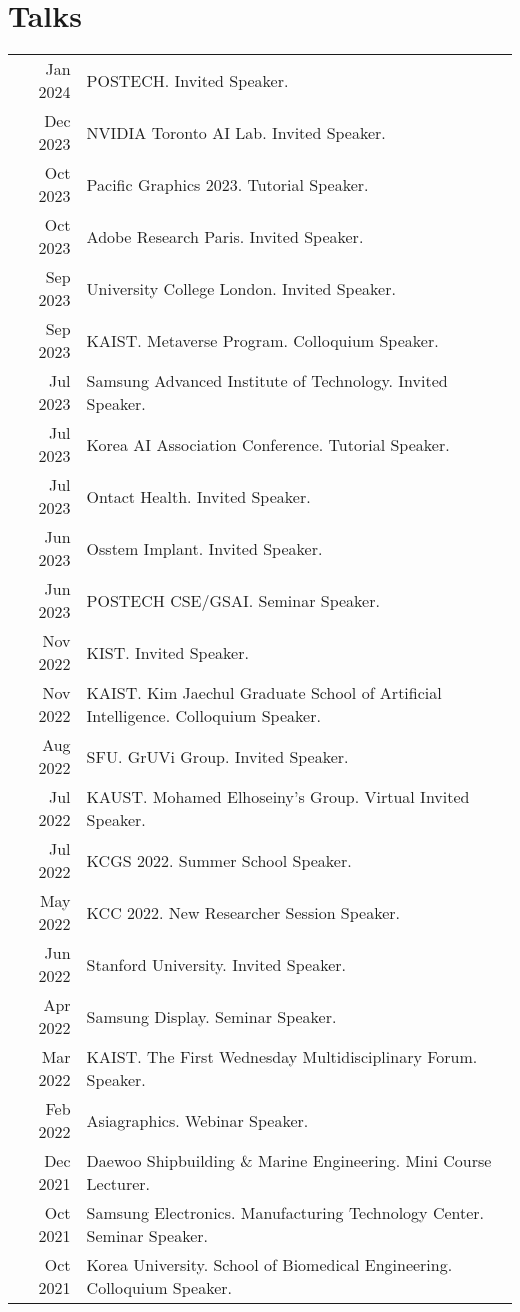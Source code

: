 \documentclass[letterpaper,10pt]{article} %
\begin{document}
{\section{Talks}
\begin{tabular}{r|p{11cm}}
Jan 2024 & POSTECH. Invited Speaker.\\
Dec 2023 & NVIDIA Toronto AI Lab. Invited Speaker.\\
Oct 2023 & Pacific Graphics 2023. Tutorial Speaker.\\
Oct 2023 & Adobe Research Paris. Invited Speaker.\\
Sep 2023 & University College London. Invited Speaker.\\
Sep 2023 & KAIST. Metaverse Program. Colloquium Speaker.\\
Jul 2023 & Samsung Advanced Institute of Technology. Invited Speaker.\\
Jul 2023 & Korea AI Association Conference. Tutorial Speaker.\\
Jul 2023 & Ontact Health. Invited Speaker.\\
Jun 2023 & Osstem Implant. Invited Speaker.\\
Jun 2023 & POSTECH CSE/GSAI. Seminar Speaker.\\
Nov 2022 & KIST. Invited Speaker.\\
Nov 2022 & KAIST. Kim Jaechul Graduate School of Artificial Intelligence. Colloquium Speaker.\\
Aug 2022 & SFU. GrUVi Group. Invited Speaker.\\
Jul 2022 & KAUST. Mohamed Elhoseiny's Group. Virtual Invited Speaker.\\
Jul 2022 & KCGS 2022. Summer School Speaker. \\
May 2022 & KCC 2022. New Researcher Session Speaker.\\
Jun 2022 & Stanford University. Invited Speaker.\\
Apr 2022 & Samsung Display. Seminar Speaker.\\
Mar 2022 & KAIST. The First Wednesday Multidisciplinary Forum. Speaker.\\
Feb 2022 & Asiagraphics. Webinar Speaker.\\
Dec 2021 & Daewoo Shipbuilding \& Marine Engineering. Mini Course Lecturer.\\
Oct 2021 & Samsung Electronics. Manufacturing Technology Center. Seminar Speaker.\\
Oct 2021 & Korea University. School of Biomedical Engineering. Colloquium Speaker.\\

\end{tabular}}
\end{document}
